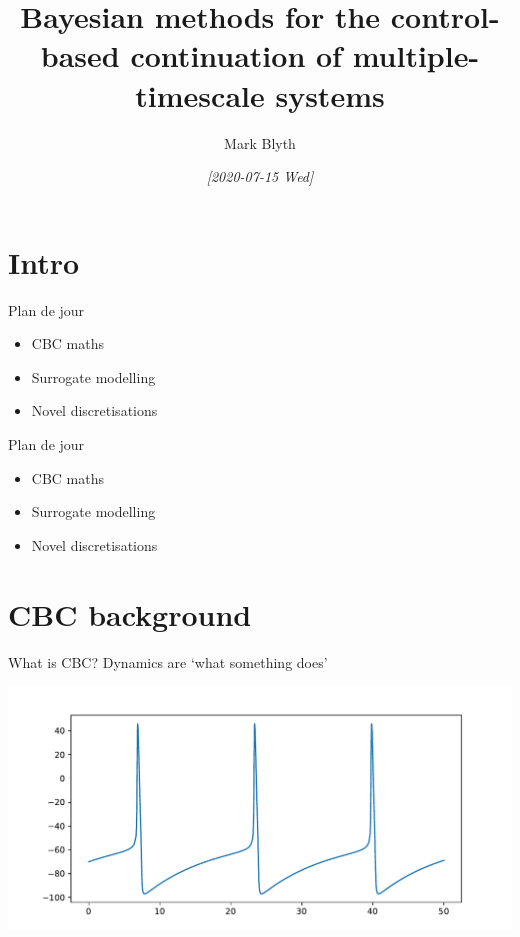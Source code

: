 \documentclass[presentation]{beamer}
\author{Mark Blyth}
\date{\textit{[2020-07-15 Wed]}}
\title{Bayesian methods for the control-based continuation of multiple-timescale systems}
\begin{document}
\maketitle

\section{Intro}
\label{sec:orgacc00e5}
\begin{frame}[label={sec:orgb9a5310}]{Plan de jour}
\begin{itemize}
\item CBC maths
\item Surrogate modelling
\item Novel discretisations
\end{itemize}
\end{frame}
\begin{frame}[label={sec:orge66598b}]{Plan de jour}
\begin{itemize}
\item \alert{CBC maths}
\item Surrogate modelling
\item Novel discretisations
\end{itemize}
\end{frame}
\section{CBC background}
\label{sec:orgea38238}
\begin{frame}[label={sec:org5a2e3ee}]{What is CBC?}
Dynamics are `what something does'

\begin{center}
\includegraphics[width=.9\linewidth]{./HH.pdf}
\end{center}
\end{frame}
\end{document}
